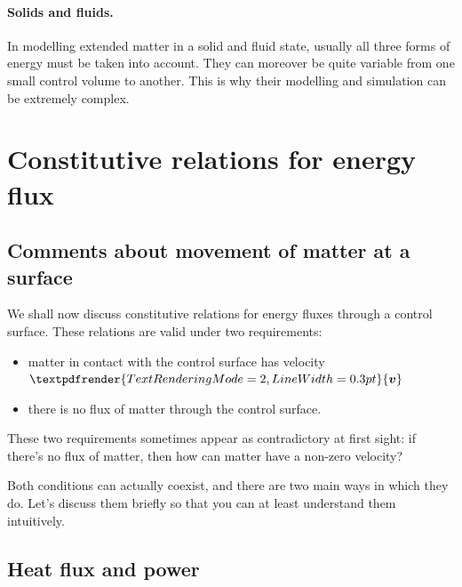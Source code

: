 \documentclass[a4paper,12pt,%
onecolumn,oneside,titlepage,%
british%
]{memoir}
\renewcommand*{\bm}[1]{\textpdfrender{TextRenderingMode=2,LineWidth=0.3pt}{\boldsymbol{#1}}}
\renewcommand*{\|}[1][]{\nonscript\:#1\vert\nonscript\:\mathopen{}}
\newcommand*{\yv}{\bm{v}}
\begin{document}
\paragraph{Solids and fluids.}

In modelling extended matter in a solid and fluid state, usually all three forms of energy must be taken into account. They can moreover be quite variable from one small control volume to another. This is why their modelling and simulation can be extremely complex.

\section{Constitutive relations for energy flux}
\label{sec:energy_constitutive_flux}


\subsection{Comments about movement of matter at a surface}
\label{sec:matter_move_surface}

We shall now discuss constitutive relations for energy fluxes through a control surface. These relations are valid under two requirements:
\begin{itemize}[nosep]
\item matter in contact with the control surface has velocity $\yv$
\item there is no flux of matter through the control surface.
\end{itemize}

These two requirements sometimes appear as contradictory at first sight: if there's no flux of matter, then how can matter have a non-zero velocity?

Both conditions can actually coexist, and there are two main ways in which they do. Let's discuss them briefly so that you can at least understand them intuitively.


\subsection{Heat flux and power}
\label{sec:heating_power}
\end{document}
